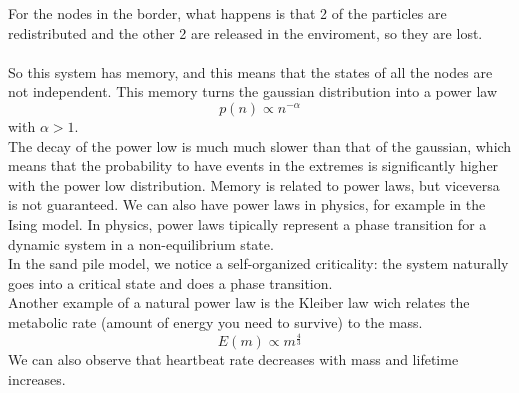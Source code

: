 \begin{center}
\end{center}
For the nodes in the border, what happens is that 2 of the particles are redistributed and the other 2 are released in the enviroment, so they are lost. \\ \\
So this system has memory, and this means that the states of all the nodes are not independent. This memory turns the gaussian distribution into a power law
$$
	p(n) \propto n^{-\alpha}
$$
with $\alpha > 1$. \\
The decay of the power low is much much slower than that of the gaussian, which means that the probability to have events in the extremes is significantly higher with the power low distribution.
Memory is related to power laws, but viceversa is not guaranteed.
We can also have power laws in physics, for example in the Ising model.
In physics, power laws tipically represent a phase transition for a dynamic system in a non-equilibrium state. \\
In the sand pile model, we notice a self-organized criticality: the system naturally goes into a critical state and does a phase transition. \\
Another example of a natural power law is the Kleiber law wich relates the metabolic rate (amount of energy you need to survive) to the mass.
\begin{equation}
	E(m) \propto m^{\frac{4}{3}}
\end{equation}
We can also observe that heartbeat rate decreases with mass and lifetime increases.
